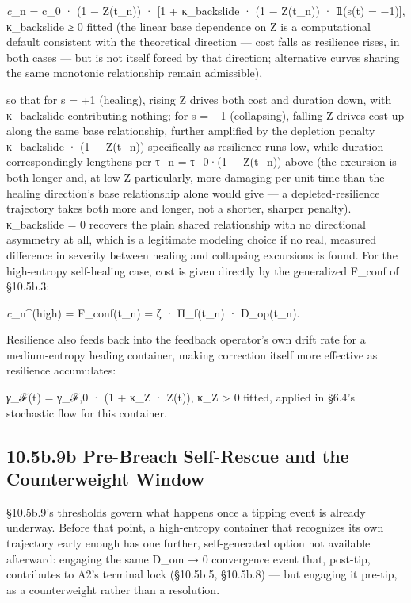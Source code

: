 \documentclass[
]{article}
\begin{document}
\emph{c}\_n = c\_0 · (1 − Z(t\_n)) · {[}1 + κ\_backslide · (1 − Z(t\_n))
· 𝟙(s(t) = −1){]}, κ\_backslide ≥ 0 fitted (the linear base dependence
on Z is a computational default consistent with the theoretical
direction --- cost falls as resilience rises, in both cases --- but is
not itself forced by that direction; alternative curves sharing the same
monotonic relationship remain admissible),

so that for s = +1 (healing), rising Z drives both cost and duration
down, with κ\_backslide contributing nothing; for s = −1 (collapsing),
falling Z drives cost up along the same base relationship, further
amplified by the depletion penalty κ\_backslide · (1 − Z(t\_n))
specifically as resilience runs low, while duration correspondingly
lengthens per τ\_n = τ\_0·(1 − Z(t\_n)) above (the excursion is both
longer and, at low Z particularly, more damaging per unit time than the
healing direction's base relationship alone would give --- a
depleted-resilience trajectory takes both more and longer, not a
shorter, sharper penalty). κ\_backslide = 0 recovers the plain shared
relationship with no directional asymmetry at all, which is a legitimate
modeling choice if no real, measured difference in severity between
healing and collapsing excursions is found. For the high-entropy
self-healing case, cost is given directly by the generalized F\_conf of
§10.5b.3:

\emph{c}\_n\^{}(high) = F\_conf(t\_n) = ζ · Π\_f(t\_n) · D\_op(t\_n).

Resilience also feeds back into the feedback operator's own drift rate
for a medium-entropy healing container, making correction itself more
effective as resilience accumulates:

\emph{γ}\_ℱ(t) = γ\_ℱ,0 · (1 + κ\_Z · Z(t)), κ\_Z \textgreater{} 0
fitted, applied in §6.4's stochastic flow for this container.

\hypertarget{b.9b-pre-breach-self-rescue-and-the-counterweight-window}{%
\subsection{10.5b.9b Pre-Breach Self-Rescue and the Counterweight
Window}\label{b.9b-pre-breach-self-rescue-and-the-counterweight-window}}

§10.5b.9's thresholds govern what happens once a tipping event is
already underway. Before that point, a high-entropy container that
recognizes its own trajectory early enough has one further,
self-generated option not available afterward: engaging the same D\_om →
0 convergence event that, post-tip, contributes to A2's terminal lock
(§10.5b.5, §10.5b.8) --- but engaging it pre-tip, as a counterweight
rather than a resolution.
\end{document}
